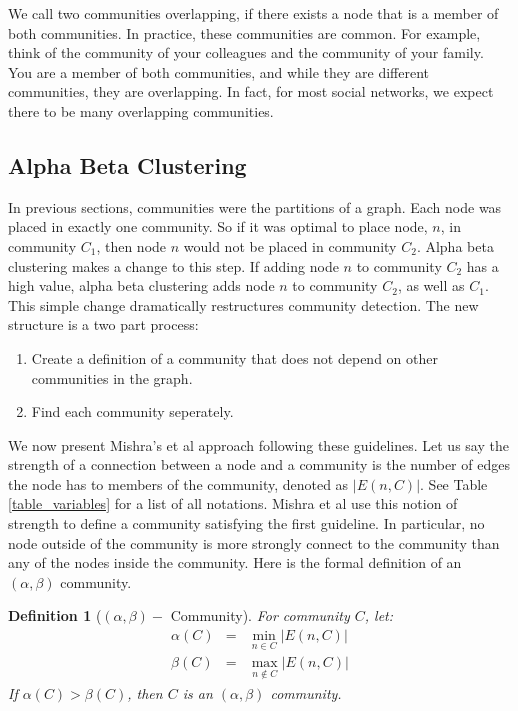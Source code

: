 \documentclass[phd,tocprelim]{cornell}
\newtheorem{definition}{Definition}
\begin{document}
We call two communities overlapping, if there exists a node that is a member of both communities.  In practice, these communities are common.  For example, think of the community of your colleagues and the community of your family. You are a member of both communities, and while they are different communities, they are overlapping.  In fact, for most social networks, we expect there to be many overlapping communities.


\subsection{Alpha Beta Clustering}

In previous sections, communities were the partitions of a graph.  Each node was placed in exactly one community.  So if it was optimal to place node, $n$, in community $C_1$, then node $n$ would not be placed in community $C_2$.  Alpha beta clustering makes a change to this step.  If adding node $n$ to community $C_2$ has a high value, alpha beta clustering adds node $n$ to community $C_2$, as well as $C_1$.  This simple change dramatically restructures community detection.  The new structure is a two part process:
\begin{enumerate}
\item Create a definition of a community that does not depend on other communities in the graph.
\item Find each community seperately.
\end{enumerate}

We now present Mishra's et al \cite{mishra} approach following these guidelines.  Let us say the strength of a connection between a node and a community is the number of edges the node has to members of the community, denoted as $|E(n, C)|$.  See Table \ref{table_variables} for a list of all notations. Mishra et al \cite{mishra} use this notion of strength to define a community satisfying the first guideline.  In particular, no node outside of the community is more strongly connect to the community than any of the nodes inside the community.  Here is the formal definition of an $(\alpha, \beta)$ community.
\begin{definition}[$(\alpha, \beta) - $ Community]
For community $C$, let:
\begin{eqnarray*}
\alpha(C) &=& \min\limits_{n \in C} |E(n, C)|\\
\beta(C) &=& \max\limits_{n \notin C} |E(n, C)|
\end{eqnarray*}
If $\alpha(C) > \beta(C)$, then $C$ is an $(\alpha, \beta)$ community.
\end{definition}
\end{document}
